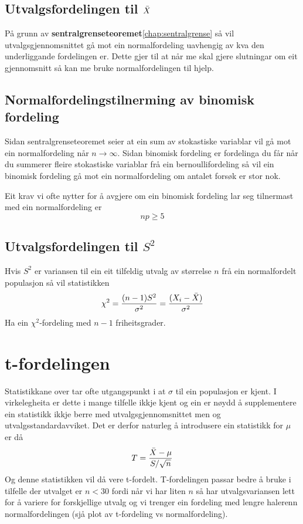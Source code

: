 \subsection{Utvalgsfordelingen til \texorpdfstring{$\Bar{X}$}{Utvalgsjennomsnittet}}
På grunn av \textbf{sentralgrenseteoremet}\ref{chap:sentralgrense} så vil utvalgsgjennomsnittet gå mot ein normalfordeling uavhengig av kva den underliggande fordelingen er. Dette gjer til at når me skal gjere slutningar om eit gjennomsnitt så kan me bruke normalfordelingen til hjelp.

\subsection{Normalfordelingstilnerming av binomisk fordeling}
Sidan sentralgrenseteoremet seier at ein sum av stokastiske variablar vil gå mot ein normalfordeling når $n \rightarrow \infty$. Sidan binomisk fordeling er fordelinga du får når du summerer fleire stokastiske variablar frå ein bernoullifordeling så vil ein binomisk fordeling gå mot ein normalfordeling om antalet forsøk er stor nok. 

Eit krav vi ofte nytter for å avgjere om ein binomisk fordeling lar seg tilnermast med ein normalfordeling er
\begin{equation}
    np \geq 5
\end{equation}

\subsection{Utvalgsfordelingen til \texorpdfstring{$S^2$}{Utvalgsvariansen}}
Hvis $S^2$ er variansen til ein eit tilfeldig utvalg av størrelse $n$ frå ein normalfordelt populasjon så vil statistikken
\begin{equation}\label{eq:vardist}
    \chi^2 = \frac{(n-1)S^2}{\sigma^2} = \frac{(X_i - \Bar{X})}{\sigma^2}
\end{equation}
Ha ein $\chi^2$-fordeling med $n - 1$ friheitsgrader.

\section{t-fordelingen}
Statistikkane over tar ofte utgangspunkt i at $\sigma$ til ein populasjon er kjent. I virkelegheita er dette i mange tilfelle ikkje kjent og ein er nøydd å supplementere ein statistikk ikkje berre med utvalgsgjennomsnittet men og utvalgsstandardavviket. Det er derfor naturleg å introdusere ein statistikk for $\mu$ er då
\begin{equation}\label{eq:tstat}
    T = \frac{\Bar{X} - \mu}{S / \sqrt{n}}
\end{equation}
Og denne statistikken vil då vere t-fordelt. T-fordelingen passar bedre å bruke i tilfelle der utvalget er $n < 30$ fordi når vi har liten $n$ så har utvalgsvariansen lett for å variere for forskjellige utvalg og vi trenger ein fordeling med lengre \startsitat haler\sluttsitat enn normalfordelingen (sjå plot av t-fordeling vs normalfordeling).

